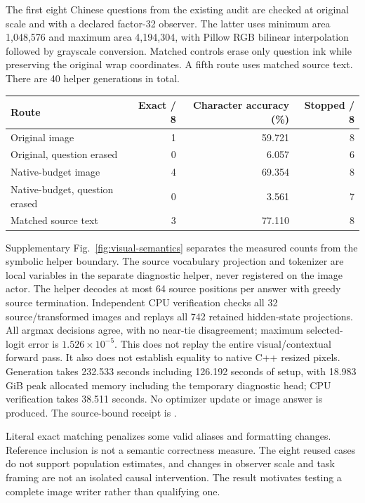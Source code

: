\documentclass[10pt,a4paper]{article}
\begin{document}
The first eight Chinese questions from the existing audit are checked at
original scale and with a declared factor-32 observer. The latter uses
minimum area 1,048,576 and maximum area 4,194,304, with Pillow RGB bilinear
interpolation followed by grayscale conversion. Matched controls erase only
question ink while preserving the original wrap coordinates. A fifth route
uses matched source text. There are 40 helper generations in total.

\begin{center}\small
\begin{tabular}{lrrr}\toprule
Route & Exact / 8 & Character accuracy (\%) & Stopped / 8\\\midrule
Original image & 1 & 59.721 & 8\\
Original, question erased & 0 & 6.057 & 6\\
Native-budget image & 4 & 69.354 & 8\\
Native-budget, question erased & 0 & 3.561 & 7\\
Matched source text & 3 & 77.110 & 8\\\bottomrule
\end{tabular}
\end{center}

Supplementary Fig.~\ref{fig:visual-semantics} separates the measured counts
from the symbolic helper boundary.
The source vocabulary projection and tokenizer are local variables in the
separate diagnostic helper, never registered on the image actor. The helper
decodes at most 64 source positions per answer with greedy source termination.
Independent CPU verification checks all 32 source/transformed images and
replays all 742 retained hidden-state projections. All argmax decisions agree,
with no near-tie disagreement; maximum selected-logit error is
$1.526\times10^{-5}$. This does not replay the entire visual/contextual forward
pass. It also does not establish equality to native C++ resized pixels.
Generation takes 232.533 seconds including 126.192 seconds of setup, with
18.983 GiB peak allocated memory including the temporary diagnostic head;
CPU verification takes 38.511 seconds. No optimizer update or image answer
is produced. The source-bound receipt is
.

Literal exact matching penalizes some valid aliases and formatting changes.
Reference inclusion is not a semantic correctness measure. The eight reused
cases do not support population estimates, and changes in observer scale and
task framing are not an isolated causal intervention. The result motivates
testing a complete image writer rather than qualifying one.
\end{document}
